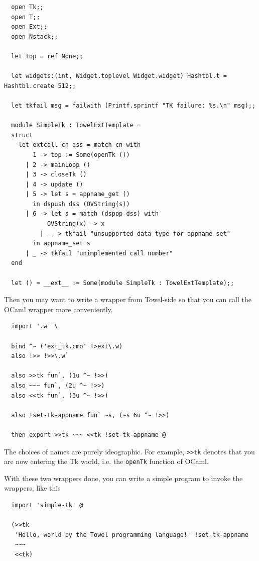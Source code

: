\documentclass{report}
\begin{document}
\begin{mdframed}[style=example]
  \begin{verbatim}
  open Tk;;
  open T;;
  open Ext;;
  open Nstack;;

  let top = ref None;;

  let widgets:(int, Widget.toplevel Widget.widget) Hashtbl.t = Hashtbl.create 512;;

  let tkfail msg = failwith (Printf.sprintf "TK failure: %s.\n" msg);;

  module SimpleTk : TowelExtTemplate =
  struct
    let extcall cn dss = match cn with
        1 -> top := Some(openTk ())
      | 2 -> mainLoop ()
      | 3 -> closeTk ()
      | 4 -> update ()
      | 5 -> let s = appname_get ()
        in dspush dss (OVString(s))
      | 6 -> let s = match (dspop dss) with
            OVString(x) -> x
          | _ -> tkfail "unsupported data type for appname_set"
        in appname_set s
      | _ -> tkfail "unimplemented call number"
  end

  let () = __ext__ := Some(module SimpleTk : TowelExtTemplate);;
  \end{verbatim}
\end{mdframed}

Then you may want to write a wrapper from Towel-side so that you can call the OCaml wrapper more conveniently.

\begin{mdframed}[style=example]
\begin{verbatim}
  import '.w' \

  bind ^~ ('ext_tk.cmo' !>ext\.w)
  also !>> !>>\.w`

  also >>tk fun`, (1u ^~ !>>)
  also ~~~ fun`, (2u ^~ !>>)
  also <<tk fun`, (3u ^~ !>>)

  also !set-tk-appname fun` ~s, (~s 6u ^~ !>>)

  then export >>tk ~~~ <<tk !set-tk-appname @
\end{verbatim}
\end{mdframed}

The choices of names are purely ideographic. For example, \texttt{>>tk} denotes that you are now entering the Tk world, i.e. the \texttt{openTk} function of OCaml.

With these two wrappers done, you can write a simple program to invoke the wrappers, like this

\begin{mdframed}[style=example]
\begin{verbatim}
  import 'simple-tk' @

  (>>tk
   'Hello, world by the Towel programming language!' !set-tk-appname
   ~~~
   <<tk)
\end{verbatim}
\end{mdframed}
\end{document}
